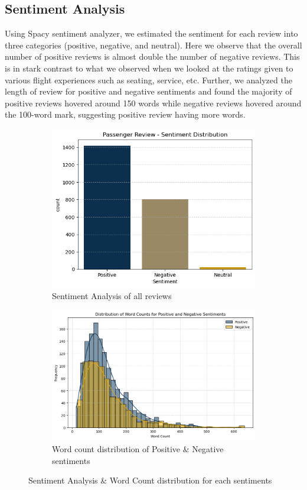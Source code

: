 \documentclass[11pt]{article} %
\begin{document}
\subsection{Sentiment Analysis}
Using Spacy sentiment analyzer, we estimated the sentiment for each review into three categories (positive, negative, and neutral). Here we observe that the overall number of positive reviews is almost double the number of negative reviews. This is in stark contrast to what we observed when we looked at the ratings given to various flight experiences such as seating, service, etc. 
Further, we analyzed the length of review for positive and negative sentiments and found the majority of positive reviews hovered around 150 words while negative reviews hovered around the 100-word mark, suggesting positive review having more words.
\begin{figure}[H]
  \centering
  \begin{subfigure}[b]{0.4\textwidth}
    \includegraphics[width=\textwidth]{images/sentiment_distribution.png}
    \caption{Sentiment Analysis of all reviews}
    \label{fig:sub1}
  \end{subfigure}
  \hfill
  \begin{subfigure}[b]{0.5\textwidth}
    \includegraphics[width=\textwidth]{images/distribution_review_length.png}
    \caption{Word count distribution of Positive \& Negative sentiments}
    \label{fig:sub2}
  \end{subfigure}
  \caption{Sentiment Analysis \& Word Count distribution for each sentiments}
\end{figure}
\end{document}
